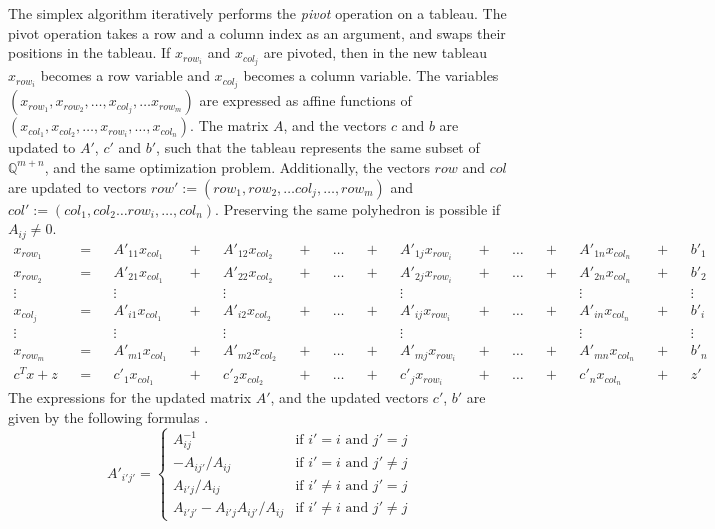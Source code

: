\documentclass[11pt]{article} %
\begin{document}
The simplex algorithm iteratively performs the \textit{pivot} operation on a tableau. The pivot operation takes a row and a column index as an argument, and swaps their positions in the tableau. If $x_{row_i}$ and $x_{col_j}$ are pivoted, then in the new tableau $x_{row_i}$ becomes a row variable and $x_{col_j}$ becomes a column variable. The variables $(x_{row_1}, x_{row_2}, \dots, x_{col_j}, \dots x_{row_m})$ are expressed as affine functions of $(x_{col_1}, x_{col_2}, \dots, x_{row_i}, \dots, x_{col_n})$. The matrix $A$, and the vectors $c$ and $b$ are updated to $A'$, $c'$ and $b'$, such that the tableau represents the same subset of $\mathbb{Q}^{m + n}$, and the same optimization problem.
Additionally, the vectors $row$ and $col$ are updated to vectors $row' := (row_1, row_2, \dots col_j, \dots, row_m)$ and $col' := (col_1, col_2 \dots row_i, \dots, col_n)$.
 Preserving the same polyhedron is possible if $A_{ij} \ne 0$.
\begin{equation}
  \begin{aligned}
    x_{row_1} && = && A'_{11}x_{col_1} && + && A'_{12}x_{col_2} && + && \dots && + && A'_{1j}x_{row_i} && + && \dots && + && A'_{1n}x_{col_n} && + && b'_1\\
    x_{row_2} && = && A'_{21}x_{col_1} && + && A'_{22}x_{col_2} && + && \dots && + && A'_{2j}x_{row_i} && + && \dots && + && A'_{2n}x_{col_n} && + && b'_2\\
    \vdots && && \vdots && && \vdots && && && && \vdots && && && && \vdots && && \vdots \\
    x_{col_j} && = && A'_{i1}x_{col_1} && + && A'_{i2}x_{col_2} && + && \dots && + && A'_{ij}x_{row_i}&& + && \dots && + && A'_{in}x_{col_n} && + && b'_i\\
    \vdots && && \vdots && && \vdots && && && && \vdots && && && && \vdots && && \vdots \\
    x_{row_m} && = && A'_{m1}x_{col_1} && + && A'_{m2}x_{col_2} && + && \dots && + && A'_{mj}x_{row_i}&& + && \dots && + && A'_{mn}x_{col_n} && + && b'_n\\
    c^Tx + z && = && c'_1x_{col_1} && + && c'_2x_{col_2} && + && \dots && + && c'_jx_{row_i} && + && \dots && + && c'_nx_{col_n} && + && z'
  \end{aligned}
\end{equation}
The expressions for the updated matrix $A'$, and the updated vectors $c'$, $b'$ are given by the following formulas \cite{Nelson:1980:TPV:909447}.
\begin{equation}\label{eqn:pivot_tableau}
A'_{i'j'} = \begin{cases}
  A_{ij}^{-1} & \text{if } i' = i \text{ and } j' = j \\
  -A_{ij'}/A_{ij} & \text{if } i' = i \text{ and } j' \ne j \\
  A_{i'j}/A_{ij} & \text{if } i' \ne i \text{ and } j' = j \\
  A_{i'j'} - A_{i'j}A_{ij'}/A_{ij}  & \text{if } i' \ne i \text{ and } j' \ne j
\end{cases}
\end{equation}
\end{document}
